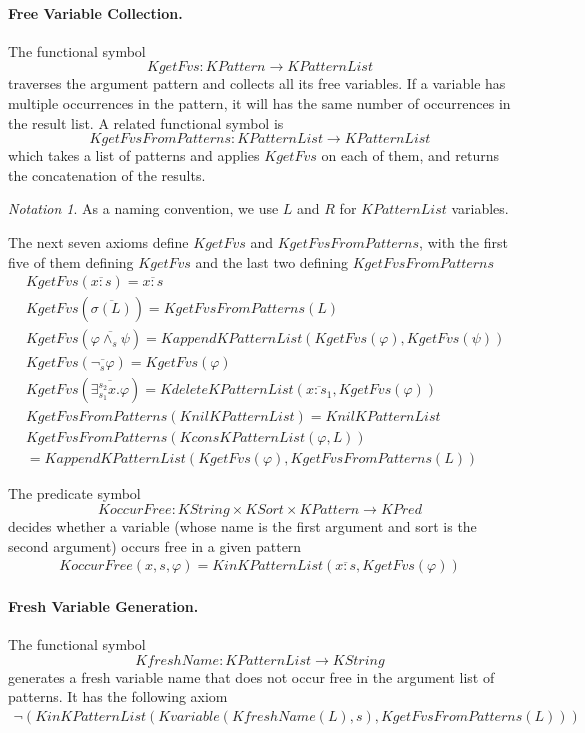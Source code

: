 \documentclass[UTF8,11pt]{article}
\newcounter{thmcounter}
\theoremstyle{plain}
\theoremstyle{definition}
\theoremstyle{remark}
\newtheorem{notation}   [thmcounter]{Notation}
\newcommand{\cln}{{:}}
\newcommand{\KPred}{\mathit{KPred}}
\newcommand{\KString}{\mathit{KString}}
\newcommand{\KSort}{\mathit{KSort}}
\newcommand{\KPatternList}{\mathit{KPatternList}}
\newcommand{\KnilKPatternList}{\mathit{KnilKPatternList}}
\newcommand{\KconsKPatternList}{\mathit{KconsKPatternList}}
\newcommand{\KappendKPatternList}{\mathit{KappendKPatternList}}
\newcommand{\KinKPatternList}{\mathit{KinKPatternList}}
\newcommand{\KdeleteKPatternList}{\mathit{KdeleteKPatternList}}
\newcommand{\KPattern}{\mathit{KPattern}}
\newcommand{\Kvariable}{\mathit{Kvariable}}
\newcommand{\KgetFvs}{\mathit{KgetFvs}}
\newcommand{\KgetFvsFromPatterns}{\mathit{KgetFvsFromPatterns}}
\newcommand{\KoccurFree}{\mathit{KoccurFree}}
\newcommand{\KfreshName}{\mathit{KfreshName}}
\begin{document}
\paragraph{Free Variable Collection.}
The functional symbol 
$$\KgetFvs \colon \KPattern \to \KPatternList$$
traverses the argument pattern and collects all its free variables.
If a variable has multiple occurrences in the pattern, it will has the same number of occurrences in the result list.
A related functional symbol is 
$$ \KgetFvsFromPatterns \colon \KPatternList \to \KPatternList $$
which takes a list of patterns and applies $\KgetFvs$ on each of them, and returns the concatenation of the results.
\begin{notation}
	As a naming convention, we use $L$ and $R$ for $\KPatternList$ variables. 
\end{notation}
The next seven axioms define $\KgetFvs$ and $\KgetFvsFromPatterns$, with the first five of them defining $\KgetFvs$ and the last two defining $\KgetFvsFromPatterns$
\begin{align*}
& \KgetFvs(\overline{x \cln s}) = \overline{x \cln s}
\\
& \KgetFvs(\overline{\sigma(L)}) = \KgetFvsFromPatterns(L)
\\
& \KgetFvs(\overline{\varphi \wedge_s \psi}) = \KappendKPatternList(\KgetFvs(\varphi), \KgetFvs(\psi))
\\
& \KgetFvs(\overline{\neg_s \varphi}) = \KgetFvs(\varphi)
\\
& \KgetFvs(\overline{\exists_{s_1}^{s_2} x . \varphi}) = \KdeleteKPatternList(\overline{x \cln s_1}, \KgetFvs(\varphi))
\\
& \KgetFvsFromPatterns(\KnilKPatternList) = \KnilKPatternList
\\
& \KgetFvsFromPatterns(\KconsKPatternList(\varphi, L))
\\
& = \KappendKPatternList(\KgetFvs(\varphi), \KgetFvsFromPatterns(L))
\end{align*}

The predicate symbol
$$ \KoccurFree \colon \KString \times \KSort \times \KPattern \to \KPred $$
decides whether a variable (whose name is the first argument and sort is the second argument) occurs free in a given pattern
\begin{align*}
  \KoccurFree(x, s, \varphi) = \KinKPatternList(\overline{x \cln s}, \KgetFvs(\varphi))
\end{align*}

\paragraph{Fresh Variable Generation.}
The functional symbol
$$\KfreshName \colon \KPatternList \to \KString$$ 
generates a fresh variable name that does not occur free in the argument list of patterns.
It has the following axiom
\begin{align*}
\neg(\KinKPatternList(\Kvariable(\KfreshName(L), s), \KgetFvsFromPatterns(L)))
\end{align*}
\end{document}
